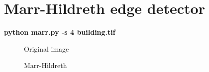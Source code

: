 \pagebreak

\section{Marr-Hildreth edge detector}

    \textbf{python marr.py -s 4 building.tif}

    \begin{figure}[!htb]\centering
        \begin{minipage}{0.8\textwidth}
            \caption{\small{Original image}}\label{diagram:building}
        \end{minipage}
    \end{figure}

    \begin{figure}[!htb]\centering
        \begin{minipage}{0.8\textwidth}
            \caption{\small{Marr-Hildreth}}\label{diagram:marr}
        \end{minipage}
    \end{figure}

